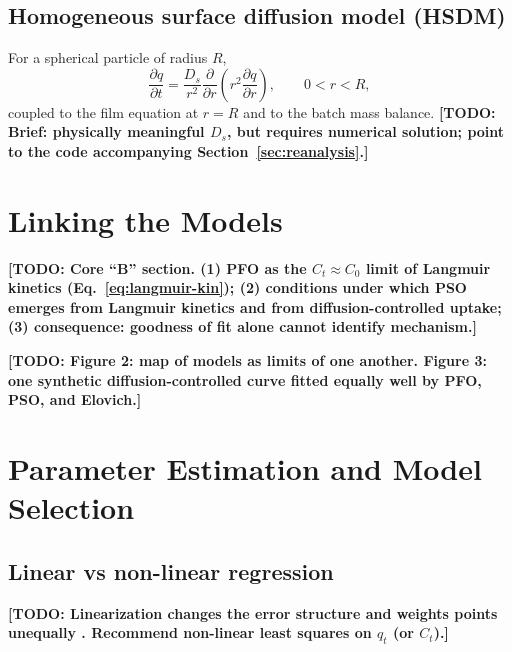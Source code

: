 \documentclass[11pt,a4paper]{article}
\newcommand{\todo}[1]{\textbf{[TODO: #1]}}
\begin{document}
\subsection{Homogeneous surface diffusion model (HSDM)}
For a spherical particle of radius $R$,
\begin{equation}
  \frac{\partial q}{\partial t} =
  \frac{D_s}{r^2}\frac{\partial}{\partial r}
  \left(r^2 \frac{\partial q}{\partial r}\right),
  \qquad 0 < r < R,
  \label{eq:hsdm}
\end{equation}
coupled to the film equation at $r = R$ and to the batch mass balance.
\todo{Brief: physically meaningful $D_s$, but requires numerical solution;
point to the code accompanying Section~\ref{sec:reanalysis}.}

\section{Linking the Models}
\label{sec:linking}

\todo{Core ``B'' section. (1) PFO as the $C_t \approx C_0$ limit of
Langmuir kinetics (Eq.~\ref{eq:langmuir-kin}); (2) conditions under which
PSO emerges from Langmuir kinetics and from diffusion-controlled uptake;
(3) consequence: goodness of fit alone cannot identify mechanism.}

\todo{Figure 2: map of models as limits of one another.
Figure 3: one synthetic diffusion-controlled curve fitted equally well by
PFO, PSO, and Elovich.}

\section{Parameter Estimation and Model Selection}
\label{sec:estimation}

\subsection{Linear vs non-linear regression}
\todo{Linearization changes the error structure and weights points
unequally \parencite{Foo2010_IsothermModeling,Tran2017_AdsorptionMistakes}.
Recommend non-linear least squares on $q_t$ (or $C_t$).}
\end{document}
